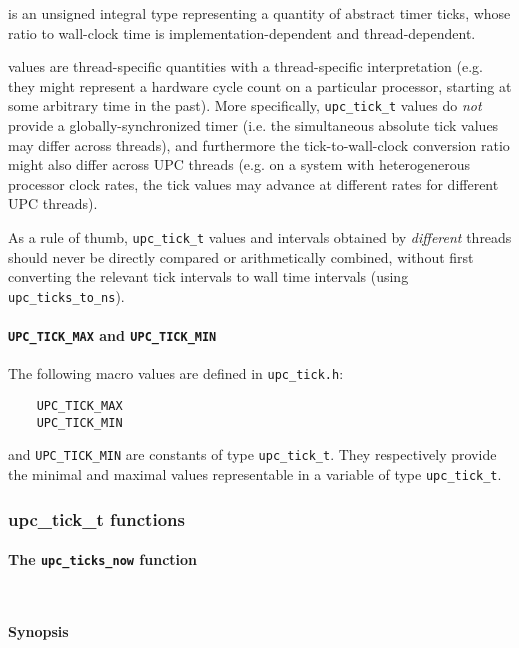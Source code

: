  is an unsigned integral type representing a quantity of abstract timer ticks,
whose ratio to wall-clock time is implementation-dependent and thread-dependent.

 values are thread-specific quantities with a thread-specific
interpretation (e.g. they might represent a
hardware cycle count on a particular processor, starting at some arbitrary time in
the past).  More specifically,  {\tt upc\_tick\_t} values do {\it not} provide a
globally-synchronized timer (i.e. the simultaneous absolute tick values may
differ across threads), and furthermore the tick-to-wall-clock conversion ratio
might also differ across UPC threads (e.g. on a system with heterogenerous processor
clock rates, the tick values may advance at different rates for different UPC
threads). 

\np As a rule of thumb, {\tt upc\_tick\_t} values and intervals
obtained by {\it different} threads should never be directly
compared or arithmetically combined, without first converting the relevant tick
intervals to wall time intervals (using {\tt upc\_ticks\_to\_ns}).

\paragraph{{\tt UPC\_TICK\_MAX} and {\tt UPC\_TICK\_MIN}}

\npf The following macro values are defined in {\tt upc\_tick.h}:

\begin{verbatim}
    UPC_TICK_MAX
    UPC_TICK_MIN
\end{verbatim}

 and {\tt UPC\_TICK\_MIN} are constants of type {\tt upc\_tick\_t}.
They respectively provide the
minimal and maximal values representable in a variable of type {\tt upc\_tick\_t}.

\subsubsection{upc\_tick\_t functions}

\paragraph{The {\tt upc\_ticks\_now} function}\ \\
\label{upc-ticks-now}

{\bf Synopsis}

